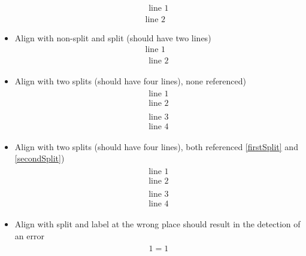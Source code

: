 \documentclass{article}
\begin{document}
\begin{itemize}
\begin{align}
				\begin{split}
					\text{line 1}
				\end{split}
				\\
				\text{line 2}
			\end{align}
		\item Align with non-split and split (should have two lines)
			\begin{align}
				\text{line 1}
				\\
				\begin{split}
					\text{line 2}
				\end{split}
			\end{align}
		\item Align with two splits (should have four lines), none referenced)
			\begin{align}
				\begin{split}
					\text{line 1}
					\\
					\text{line 2}
				\end{split}
				\\
				\begin{split}
					\text{line 3}
					\\
					\text{line 4}
				\end{split}
			\end{align}
		\item Align with two splits (should have four lines), both referenced \ref{firstSplit} and \ref{secondSplit})
			\begin{align}
				\label{firstSplit}
				\begin{split}
					\text{line 1}
					\\
					\text{line 2}
				\end{split}
				\\
				\label{secondSplit}
				\begin{split}
					\text{line 3}
					\\
					\text{line 4}
				\end{split}
			\end{align}
		\item Align with split and label at the wrong place should result in the detection of an error
			{
				\def\PackageError#1#2#3{\\\text{Package error successfully detected.}}%
				\begin{align}
					\begin{split}
						1 = 1
					\end{split}

\end{align}}
\end{itemize}
\end{document}
